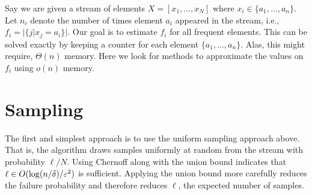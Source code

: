 



Say we are given a stream of elements $X = [x_1,\ldots,x_N]$ where $x_i \in \{a_1,\ldots,a_n\}$.
Let $n_i$ denote the number of times element $a_i$ appeared in the stream, i.e., $f_i = |\{ j | x_j = a_i \}|$.
Our goal is to estimate $f_i$ for all frequent elements.
This can be solved exactly by keeping a counter for each element $\{a_1,\ldots,a_n\}$. 
Alas, this might require, $\Theta(n)$ memory. Here we look for methods to approximate the values on $f_i$ using $o(n)$ memory.

\section{Sampling}

The first and simplest approach is to use the uniform sampling approach above.
That is, the algorithm draws samples uniformly at random from the stream with probability $\ell /N$.
Using Chernoff along with the union bound 
indicates that $\ell \in O(\log(n/\delta)/\varepsilon^2)$ is sufficient.
Applying the union bound more carefully reduces the failure probability and therefore reduces $\ell$, 
the expected number of samples.



